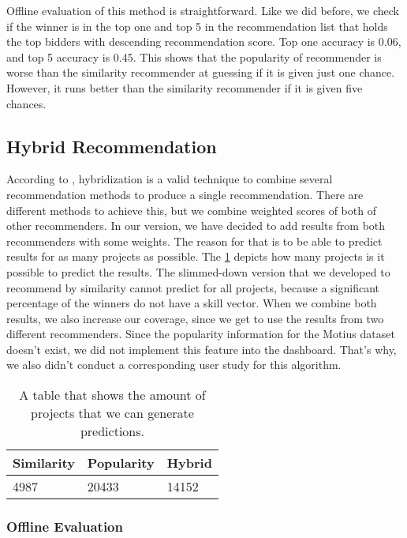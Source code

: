 Offline evaluation of this method is straightforward. Like we did before, we check if the winner is in the top one and top 5 in the recommendation list that holds the top bidders with descending recommendation score. Top one accuracy is 0.06, and top 5 accuracy is 0.45. This shows that the popularity of recommender is worse than the similarity recommender at guessing if it is given just one chance. However, it runs better than the similarity recommender if it is given five chances. 


\subsection{Hybrid Recommendation}

According to \cite{burke2002hybrid}, hybridization is a valid technique to combine several recommendation methods to produce a single recommendation. There are different methods to achieve this, but we combine weighted scores of both of other recommenders. In our version, we have decided to add results from both recommenders with some weights. The reason for that is to be able to predict results for as many projects as possible. The \ref{tab:evaluation-amount-prediction} depicts how many projects is it possible to predict the results. The slimmed-down version that we developed to recommend by similarity cannot predict for all projects, because a significant percentage of the winners do not have a skill vector. When we combine both results, we also increase our coverage, since we get to use the results from two different recommenders. Since the popularity information for the Motius dataset doesn't exist, we did not implement this feature into the dashboard. That's why, we also didn't conduct a corresponding user study for this algorithm.

\begin{table}[htpb]
	\caption[The number of predicted projects]{A table that shows the amount of projects that we can generate predictions.}\label{tab:evaluation-amount-prediction}
	\centering
	\begin{tabular}{l l l}
		\toprule
		Similarity & Popularity & Hybrid \\
		\midrule
		4987 & 20433 & 14152 \\
		\bottomrule
	\end{tabular}
\end{table}


\subsubsection{Offline Evaluation}

